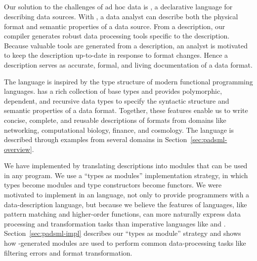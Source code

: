 
\subsection{\padsmlbig{}}

Our solution to the challenges of ad hoc data is \padsml{}, a
declarative language for describing data sources.  With \padsml{}, a
data analyst can describe both the physical format and semantic
properties of a data source.  From a \padsml{} description, our
compiler generates robust data processing tools specific to the
description.  Because valuable tools are generated from a description,
an analyst is motivated to keep the description up-to-date in response
to format changes.  Hence a \padsml{} description serves as accurate,
formal, and living documentation of a data format.


The \padsml{} language is inspired by the type structure of modern
functional programming languages.  \padsml{} has a rich collection of base
types and provides polymorphic, dependent, and recursive data types to
specify the syntactic structure and semantic properties of a data
format.  Together, these features enable us to write concise,
complete, and reusable descriptions of formats from domains like
networking, computational biology, finance, and cosmology.  The
\padsml{} language is described through examples from several domains
in Section~\ref{sec:padsml-overview}.


We have implemented \padsml{} by translating descriptions into
\ocaml{} modules that can be used in any \ocaml{} program.  We use a
``types as modules'' implementation strategy, in which \padsml{} types
become modules and \padsml{} type constructors become functors. 
We were motivated to implement \padsml{} in an \ml{} language, not
only to provide \ml{} programmers with a data-description language,
but because we believe the features of \ml{} languages, like pattern
matching and higher-order functions, can more naturally express data
processing and transformation tasks than imperative languages like
\C{} and \java{}.
Section~\ref{sec:padsml-impl} describes our ``types as module''
strategy and shows how \padsml{}-generated modules are used to perform common
data-processing tasks like filtering errors and format transformation.

